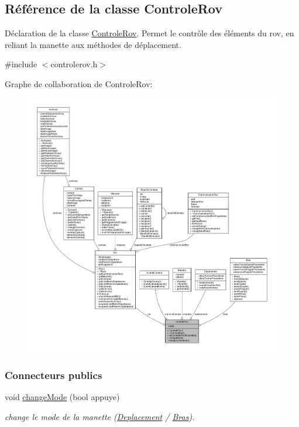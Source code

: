 \hypertarget{class_controle_rov}{}\subsection{Référence de la classe Controle\+Rov}
\label{class_controle_rov}


Déclaration de la classe \hyperlink{class_controle_rov}{Controle\+Rov}. Permet le contrôle des éléments du rov, en reliant la manette aux méthodes de déplacement.  




{\ttfamily \#include $<$controlerov.\+h$>$}



Graphe de collaboration de Controle\+Rov\+:
\nopagebreak
\begin{figure}[H]
\begin{center}
\leavevmode
\includegraphics[width=350pt]{class_controle_rov__coll__graph}
\end{center}
\end{figure}
\subsubsection*{Connecteurs publics}
\begin{DoxyCompactItemize}
\item 
void \hyperlink{class_controle_rov_a206d52adf49b8510316b2885ea6b98b0}{change\+Mode} (bool appuye)
\begin{DoxyCompactList}\small\item\em change le mode de la manette (\hyperlink{class_deplacement}{Deplacement} / \hyperlink{class_bras}{Bras}). \end{DoxyCompactList}\end{DoxyCompactItemize}
